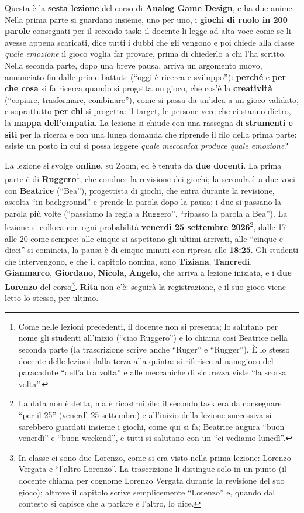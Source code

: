 Questa è la \textbf{sesta lezione} del corso di \textbf{Analog Game Design}, e ha
due anime. Nella prima parte si guardano insieme, uno per uno, i \textbf{giochi di
ruolo in 200 parole} consegnati per il secondo task: il docente li legge ad alta
voce come se li avesse appena scaricati, dice tutti i dubbi che gli vengono e poi
chiede alla classe \emph{quale emozione} il gioco voglia far provare, prima di
chiederlo a chi l'ha scritto. Nella seconda parte, dopo una breve pausa, arriva un
argomento nuovo, annunciato fin dalle prime battute (``oggi è ricerca e sviluppo''):
\textbf{perché} e \textbf{per che cosa} si fa ricerca quando si progetta un gioco,
che cos'è la \textbf{creatività} (``copiare, trasformare, combinare''), come si
passa da un'idea a un gioco validato, e soprattutto \textbf{per chi} si progetta:
il target, le persone vere che ci stanno dietro, la \textbf{mappa dell'empatia}.
La lezione si chiude con una rassegna di \textbf{strumenti e siti} per la ricerca e
con una lunga domanda che riprende il filo della prima parte: esiste un posto in cui
si possa leggere \emph{quale meccanica produce quale emozione}?

La lezione si svolge \textbf{online}, su Zoom, ed è tenuta da \textbf{due docenti}.
La prima parte è di \textbf{Ruggero}\footnote{Come nelle lezioni precedenti, il
docente non si presenta; lo salutano per nome gli studenti all'inizio (``ciao
Ruggero'') e lo chiama così Beatrice nella seconda parte (la trascrizione scrive
anche ``Ruger'' e ``Rugger''). È lo stesso docente delle lezioni dalla terza alla
quinta: si riferisce al nanogioco del paracadute ``dell'altra volta'' e alle
meccaniche di sicurezza viste ``la scorsa volta''.}, che conduce la revisione dei
giochi; la seconda è a due voci con \textbf{Beatrice} (``Bea''), progettista di
giochi, che entra durante la revisione, ascolta ``in background'' e prende la parola
dopo la pausa; i due si passano la parola più volte (``passiamo la regia a
Ruggero'', ``ripasso la parola a Bea''). La lezione si colloca con ogni probabilità
\textbf{venerdì 25 settembre 2026}\footnote{La data non è detta, ma è ricostruibile:
il secondo task era da consegnare ``per il 25'' (venerdì 25 settembre) e
all'inizio della lezione successiva si sarebbero guardati insieme i giochi, come
qui si fa; Beatrice augura ``buon venerdì'' e ``buon weekend'', e tutti si
salutano con un ``ci vediamo lunedì''.}, dalle 17 alle 20 come sempre: alle cinque
si aspettano gli ultimi arrivati, alle ``cinque e dieci'' si comincia, la pausa è
di cinque minuti con ripresa alle \textbf{18:25}. Gli studenti che intervengono, e
che il capitolo nomina, sono \textbf{Tiziana}, \textbf{Tancredi},
\textbf{Gianmarco}, \textbf{Giordano}, \textbf{Nicola}, \textbf{Angelo}, che arriva a
lezione iniziata, e i \textbf{due Lorenzo} del corso\footnote{In classe ci sono due
Lorenzo, come si era visto nella prima lezione: Lorenzo Vergata e ``l'altro
Lorenzo''. La trascrizione li distingue solo in un punto (il docente chiama per
cognome Lorenzo Vergata durante la revisione del suo gioco); altrove il capitolo
scrive semplicemente ``Lorenzo'' e, quando dal contesto si capisce che a parlare è
l'altro, lo dice.}. \textbf{Rita} non c'è: seguirà la registrazione, e il suo gioco
viene letto lo stesso, per ultimo.

